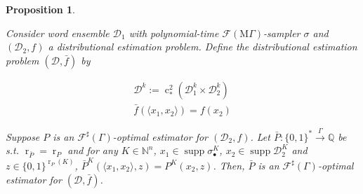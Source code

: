 \documentclass{article}
\numberwithin{equation}{section}
\theoremstyle{definition}
\theoremstyle{plain}
\newtheorem{proposition}{Proposition}[section]
\newcommand{\Bool}{\{0,1\}}
\newcommand{\Words}{{\Bool^*}}
\DeclareMathOperator{\Supp}{supp}
\DeclareMathOperator{\R}{r}
\DeclareMathOperator{\En}{c}
\newcommand{\Nats}{\mathbb{N}}
\newcommand{\Rats}{\mathbb{Q}}
\newcommand{\Chev}[1]{\langle #1 \rangle}
\newcommand{\Dist}{\mathcal{D}}
\newcommand{\MGrow}{\mathrm{M}\Gamma}
\newcommand{\Fall}{\mathcal{F}}
\newcommand{\ESG}{\Fall^\sharp(\Gamma)}
\newcommand{\EMG}{\Fall(\MGrow)}
\newcommand{\Scheme}{\xrightarrow{\Gamma}}
\begin{document}
\begin{samepage}
\begin{proposition}
\label{prp:thm__mult__op}

Consider word ensemble $\Dist_1$  with polynomial-time $\EMG$-sampler $\sigma$ and $(\Dist_2,f)$ a distributional estimation problem. Define the distributional estimation problem $(\Dist,\bar{f})$ by 

\begin{align*}
\Dist^k:=\En_*^2(\Dist_1^k \times \Dist_2^k)\\
\bar{f}(\Chev{x_1,x_2})=f(x_2)
\end{align*}

Suppose $P$ is an $\ESG$-optimal estimator for $(\Dist_2,f)$. Let ${\bar{P}: \Words \Scheme \Rats}$ be s.t. $\R_{\bar{P}}=\R_P$ and for any $K \in \Nats^n$, $x_1 \in \Supp \sigma_\bullet^K$, $x_2 \in \Supp \Dist_2^K$ and $z \in \Bool^{\R_P(K)}$, $\bar{P}^K(\Chev{x_1,x_2},z)=P^K(x_2,z)$. Then, $\bar{P}$ is an $\ESG$-optimal estimator for $(\Dist,\bar{f})$.

\end{proposition}
\end{samepage}
\end{document}
